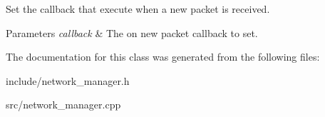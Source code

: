 Set the callback that execute when a new packet is received. 


\begin{DoxyParams}{Parameters}
{\em callback} & The on new packet callback to set. \\
\hline
\end{DoxyParams}


The documentation for this class was generated from the following files\+:\begin{DoxyCompactItemize}
\item 
include/network\+\_\+manager.\+h\item 
src/network\+\_\+manager.\+cpp\end{DoxyCompactItemize}
